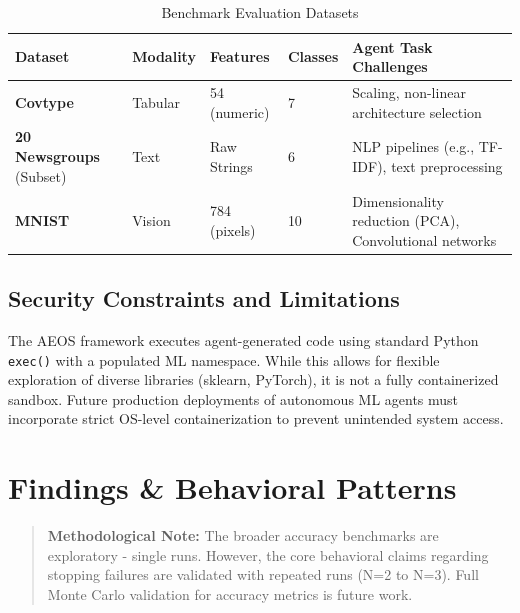 \documentclass[11pt]{article}
\begin{document}
\begin{table}[H]
  \centering
  \caption{Benchmark Evaluation Datasets}
  \label{tab:datasets}
  \begin{tabular}{lllll}
    \toprule
    \textbf{Dataset} & \textbf{Modality} & \textbf{Features} & \textbf{Classes} & \textbf{Agent Task Challenges} \\
    \midrule
    \textbf{Covtype} & Tabular & 54 (numeric) & 7 & Scaling, non-linear architecture selection \\
    \textbf{20 Newsgroups} (Subset) & Text & Raw Strings & 6 & NLP pipelines (e.g., TF-IDF), text preprocessing \\
    \textbf{MNIST} & Vision & 784 (pixels) & 10 & Dimensionality reduction (PCA), Convolutional networks \\
    \bottomrule
  \end{tabular}
\end{table}

\subsection{Security Constraints and Limitations}
The AEOS framework executes agent-generated code using standard Python \texttt{exec()} with a populated ML namespace. While this allows for flexible exploration of diverse libraries (sklearn, PyTorch), it is not a fully containerized sandbox. Future production deployments of autonomous ML agents must incorporate strict OS-level containerization to prevent unintended system access.

\section{Findings \& Behavioral Patterns}
\label{sec:findings}

\begin{quote}
\textbf{Methodological Note:} The broader accuracy benchmarks are exploratory - single runs. However, the core behavioral claims regarding stopping failures are validated with repeated runs (N=2 to N=3). Full Monte Carlo validation for accuracy metrics is future work.
\end{quote}
\end{document}
